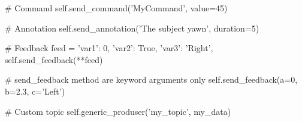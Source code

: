 \begin{python}
# Command
self.send_command('MyCommand', value=45)

# Annotation
self.send_annotation('The subject yawn', duration=5)

# Feedback
feed = {'var1': 0,
        'var2': True,
        'var3': 'Right',
       }
self.send_feedback(**feed)

# send_feedback method are keyword arguments only
self.send_feedback(a=0, b=2.3, c='Left')

# Custom topic
self.generic_produser('my_topic', my_data)

\end{python}